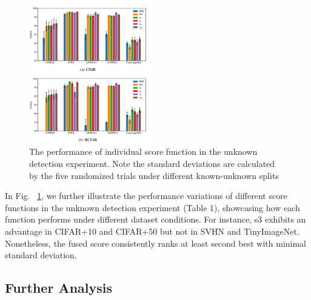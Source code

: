 \documentclass{gji}
\begin{document}
\begin{figure}  
\centering
  \includegraphics[width=0.48\textwidth]{fig7.png}
     \caption{The performance of individual score function in the unknown detection experiment. Note the standard deviations are calculated by the five randomized trials under different known-unknown splits} \label{fig5}
    
  \end{figure}
  In Fig. ~\ref{fig5}, we further illustrate the performance variations of different score functions in the unknown detection experiment (Table 1), showcasing how each function performs under different dataset conditions. For instance, s3 exhibits an advantage in CIFAR+10 and CIFAR+50 but not in SVHN and TinyImageNet. Nonetheless, the fused score consistently ranks at least second best with minimal standard deviation.
\subsection{Further Analysis}
\end{document}
